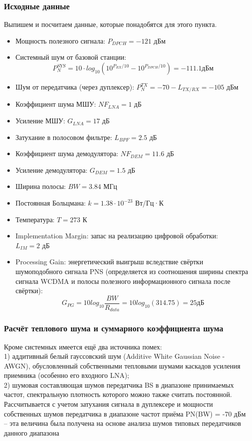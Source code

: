 \documentclass[a4paper,12pt]{article}
\begin{document}
\subsubsection{Исходные данные}
Выпишем и посчитаем данные, которые понадобятся для этого пункта.
\begin{itemize}
\item Мощность полезного сигнала: $P_{DPCH} = -121$ дБм
\item Системный шум от базовой станции:
\begin{equation}
P_{N}^{SYS} = 10 · log_{10}(10^{P_{RX}/10} - 10^{P_{DPCH}/10})= -111.1 \text{дБм}
\end{equation}
\item Шум от передатчика (через дуплексер): $P_{N}^{TX} = -70 - L_{TX/RX} = -105$ дБм
\item Коэффициент шума МШУ: $NF_{LNA} = 1$ дБ
\item Усиление МШУ: $G_{LNA} = 17$ дБ
\item Затухание в полосовом фильтре: $L_{BPF} = 2.5$ дБ
\item Коэффициент шума демодулятора: $NF_{DEM} = 11.6$ дБ
\item Усиление демодулятора: $G_{DEM} = 1.5$ дБ
\item Ширина полосы: $BW = 3.84$ МГц 
\item Постоянная Больцмана: $k = 1.38\cdot10^{-23}$ Вт/Гц·К
\item Температура: $T = 273$ К 
\item Implementation Margin: запас на реализацию цифровой обработки:\\ $L_{IM} = 2$ дБ
\item Processing Gain: энергетический выигрыш вследствие свёртки шумоподобного сигнала PNS (определяется из соотношения ширины спектра сигнала WCDMA и полосы полезного информационного сигнала после свёртки): 
\begin{equation}
G_{PG} = 10  log_{10}\frac{BW}{R_{data}} = 10log_{10}(314.75) = 25 \text{дБ}
\end{equation}
\end{itemize}
\subsubsection{Расчёт теплового шума и суммарного коэффициента шума}
Кроме системных имеется ещё два источника помех:  \\
1) аддитивный белый гауссовский шум (Additive White Gaussian Noise - AWGN), обусловленный собственными тепловыми шумами каскадов усиления приемника (особенно его входного LNA);\\
2) шумовая составляющая шумов передатчика BS в диапазоне принимаемых частот, спектральную плотность которого можно также считать постоянной. Рассчитывается с учетом затухания сигнала в дуплексере и мощности собственных шумов передатчика в диапазоне частот приёма PN(BW) = -70 дБм -- эта величина была получена на основе анализа шумов типовых передатчиков данного диапазона\\
\end{document}
